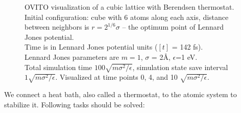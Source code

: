 \documentclass[12pt,a4paper]{article}
\begin{document}
\begin{figure}[h!]
\begin{minipage}{.3\textwidth}
	\end{minipage}
	\caption{OVITO visualization of a cubic lattice with Berendsen thermostat.\\
		Initial configuration: cube with 6 atoms along each axis, distance between neighbors is $r=2^{1/6}\sigma$ -- the optimum point of Lennard Jones potential.\\	
		Time is in Lennard Jones potential units ($[t]$ = 142 fs).\\
		Lennard Jones parameters are $m=1$, $\sigma$ = 2Å, $\epsilon$=1 eV.\\
		Total simulation time \( 100 \sqrt{m\sigma^2 / \epsilon} \), simulation state save interval \( 1 \sqrt{m\sigma^2 / \epsilon} \).
		Visualized at time points 0, 4, and 10 $\sqrt{m\sigma^2 / \epsilon}$.
	}
	\label{fig:first_simulation_ovito}
\end{figure}

\clearpage

We connect a heat bath, also called a thermostat, to the atomic system to stabilize it. Following tasks should be solved:
\end{document}
